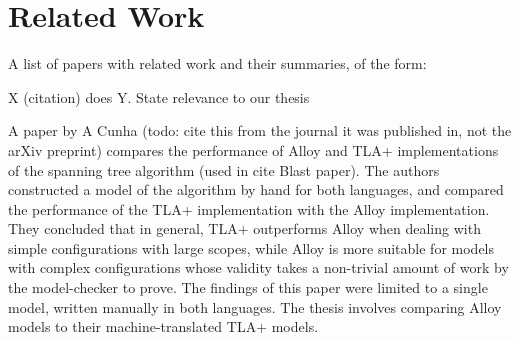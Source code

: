 \chapter{Related Work}


A list of papers with related work and their summaries, of the form:


X (citation) does Y. State relevance to our thesis



A paper by A Cunha (todo: cite this from the journal it was published in, not the arXiv preprint) compares the performance of Alloy and TLA+ implementations of the spanning tree algorithm (used in cite Blast paper). The authors constructed a model of the algorithm by hand for both languages, and compared the performance of the TLA+ implementation with the Alloy implementation. They concluded that in general, TLA+ outperforms Alloy when dealing with simple configurations with large scopes, while Alloy is more suitable for models with complex configurations whose validity takes a non-trivial amount of work by the model-checker to prove. The findings of this paper were limited to a single model, written manually in both languages. The thesis involves comparing Alloy models to their machine-translated TLA+ models.